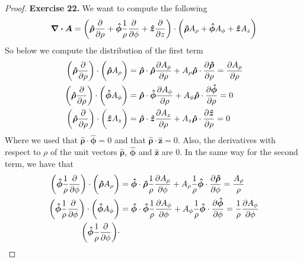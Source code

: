 \documentclass[11pt]{article}
\newcommand{\hatz}{\bm{\hat{z}}}
\newcommand{\hatrho}{\bm{\hat{\rho}}}
\newcommand{\hatphi}{\bm{\hat{\phi}}}
\theoremstyle{definition}
\begin{document}
\cleardoublepage
\begin{proof}{\textbf{Exercise 22.}}
    We want to compute the following
    \begin{align*}
        \divergence{\bm{A}} =
        \bigg(
            \hatrho \partialderivative{}{\rho}
            + \hatphi \frac{1}{\rho}\partialderivative{}{\phi}
            + \hatz \partialderivative{}{z}
        \bigg)\cdot
        \bigg(
            \hatrho A_\rho + \hatphi A_\phi + \hatz A_z
        \bigg)
    \end{align*}
    So below we compute the distribution of the first term
    \begin{align*}
        \bigg(\hatrho \partialderivative{}{\rho}\bigg)\cdot
        \bigg(\hatrho A_\rho\bigg)
        &= \hatrho \cdot \hatrho \partialderivative{A_\rho}{\rho}
        + A_\rho \hatrho \cdot \partialderivative{\hatrho}{\rho}
        = \partialderivative{A_\rho}{\rho}\\
        \bigg(\hatrho \partialderivative{}{\rho}\bigg)\cdot
        \bigg(\hatphi A_\phi\bigg)
        &= \hatrho \cdot \hatphi \partialderivative{A_\phi}{\rho}
        + A_\phi \hatrho \cdot \partialderivative{\hatphi}{\rho}
        = 0\\
        \bigg(\hatrho \partialderivative{}{\rho}\bigg)\cdot
        \bigg(\hatz A_z\bigg)
        &= \hatrho \cdot \hatz \partialderivative{A_z}{\rho}
        + A_z \hatrho \cdot \partialderivative{\hatz}{\rho}
        = 0
    \end{align*}
    Where we used that $\hatrho \cdot \hatphi = 0$ and that
    $\hatrho \cdot \hatz = 0$. Also, the derivatives with respect to $\rho$
    of the unit vectors $\hatrho$, $\hatphi$ and $\hatz$ are 0.
    In the same way for the second term, we have that
    \begin{align*}
        \bigg(\hatphi \frac{1}{\rho} \partialderivative{}{\phi}\bigg)\cdot
        \bigg(\hatrho A_\rho\bigg)
        &= \hatphi \cdot \hatrho \frac{1}{\rho} \partialderivative{A_\rho}{\phi}
        + A_\rho \frac{1}{\rho} \hatphi \cdot \partialderivative{\hatrho}{\phi}
        = \frac{A_\rho}{\rho}\\
        \bigg(\hatphi \frac{1}{\rho} \partialderivative{}{\phi}\bigg)\cdot
        \bigg(\hatphi A_\phi\bigg)
        &= \hatphi \cdot \hatphi \frac{1}{\rho} \partialderivative{A_\phi}{\phi}
        + A_\phi\frac{1}{\rho} \hatphi \cdot \partialderivative{\hatphi}{\phi}
        = \frac{1}{\rho} \partialderivative{A_\phi}{\phi}\\
        \bigg(\hatphi \frac{1}{\rho} \partialderivative{}{\phi}\bigg)\cdot

\end{align*}
\end{proof}
\end{document}
